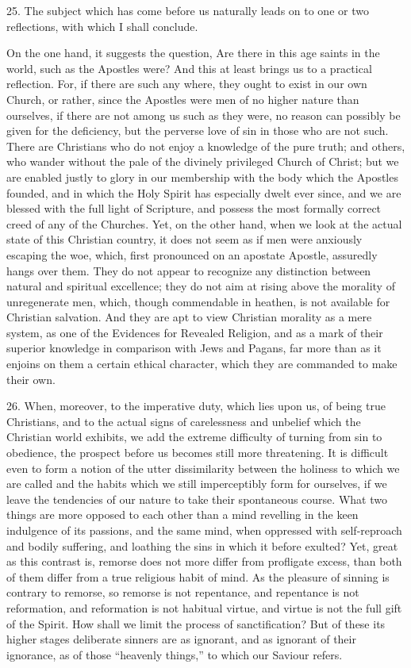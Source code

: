 25. The subject which has come before us naturally leads on to one
or two reflections, with which I shall conclude.

On the one hand, it suggests the question, Are there in this age
saints in the world, such as the Apostles were? And this at least
brings us to a practical reflection. For, if there are such any where,
they ought to exist in our own Church, or rather, since the Apostles
were men of no higher nature than ourselves, if there are not among us
such as they were, no reason can possibly be given for the deficiency,
but the perverse love of sin in those who are not such. There are
Christians who do not enjoy a knowledge of the pure truth; and others,
who wander without the pale of the divinely privileged Church of
Christ; but we are enabled justly to glory in our membership with the
body which the Apostles founded, and in which the Holy Spirit has
especially dwelt ever since, and we are blessed with the full light of
Scripture, and possess the most formally correct creed of any of the
Churches. Yet, on the other hand, when we look at the actual state of
this Christian country, it does not seem as if men were anxiously
escaping the woe, which, first pronounced on an apostate Apostle,
assuredly hangs over them. They do not appear to recognize any
distinction between natural and spiritual excellence; they do not aim
at rising above the morality of unregenerate men, which, though
commendable in heathen, is not available for Christian salvation. And
they are apt to view Christian morality as a mere system, as one of
the Evidences for Revealed Religion, and as a mark of their superior
knowledge in comparison with Jews and Pagans, far more than as it
enjoins on them a certain ethical character, which they are commanded
to make their own.

26. When, moreover, to the imperative duty, which lies upon us, of
being true Christians, and to the actual signs of carelessness and
unbelief which the Christian world exhibits, we add the extreme
difficulty of turning from sin to obedience, the prospect before us
becomes still more threatening. It is difficult even to form a notion
of the utter dissimilarity between the holiness to which we are called
and the habits which we still imperceptibly form for ourselves, if we
leave the tendencies of our nature to take their spontaneous course.
What two things are more opposed to each other than a mind revelling
in the keen indulgence of its passions, and the same mind, when
oppressed with self-reproach and bodily suffering, and loathing the
sins in which it before exulted? Yet, great as this contrast is,
remorse does not more differ from profligate excess, than both of them
differ from a true religious habit of mind. As the pleasure of sinning
is contrary to remorse, so remorse is not repentance, and repentance
is not reformation, and reformation is not habitual virtue, and virtue
is not the full gift of the Spirit. How shall we limit the process of
sanctification? But of these its higher stages deliberate sinners are
as ignorant, and as ignorant of their ignorance, as of those
``heavenly things,'' to which our Saviour refers.

